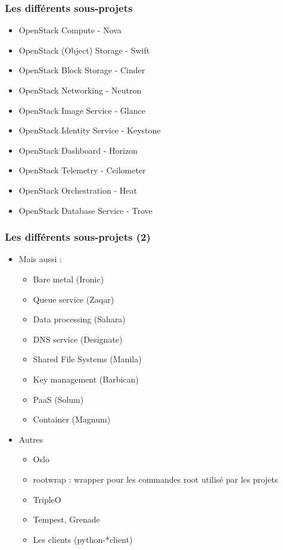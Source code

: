   \begin{frame}
    \frametitle{Les différents sous-projets}
    \begin{itemize}
        \item OpenStack Compute - Nova
        \item OpenStack (Object) Storage - Swift\pause
        \item OpenStack Block Storage - Cinder\pause
        \item OpenStack Networking - Neutron\pause
        \item OpenStack Image Service - Glance\pause
        \item OpenStack Identity Service - Keystone\pause
        \item OpenStack Dashboard - Horizon\pause
        \item OpenStack Telemetry - Ceilometer\pause
        \item OpenStack Orchestration - Heat\pause
        \item OpenStack Database Service - Trove
    \end{itemize}
  \end{frame}

  \begin{frame}
    \frametitle{Les différents sous-projets (2)}
    \begin{itemize}
      \item Mais aussi :
      \begin{itemize}
        \item Bare metal (Ironic)
        \item Queue service (Zaqar)
        \item Data processing (Sahara)
        \item DNS service (Designate)
        \item Shared File Systems (Manila)
        \item Key management (Barbican)
        \item PaaS (Solum)\pause
        \item Container (Magnum)\pause
      \end{itemize}\pause
      \item Autres
      \begin{itemize}
        \item Oslo
        \item rootwrap : wrapper pour les commandes root utilisé par les projets
        \item TripleO
        \item Tempest, Grenade
        \item Les clients (python-*client)
      \end{itemize}
    \end{itemize}
  \end{frame}

